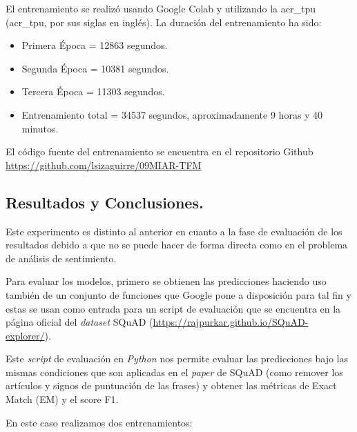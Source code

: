 El entrenamiento se realizó usando Google Colab y utilizando la \acrlong{acr_tpu} (\acrshort{acr_tpu}, por sus siglas en inglés). La duración del entrenamiento ha sido:

\begin{itemize}
    \item Primera Época = 12863 segundos.
    \item Segunda Época = 10381 segundos. 
    \item Tercera Época = 11303 segundos.
    \item Entrenamiento total = 34537 segundos, aproximadamente 9 horas y 40 minutos.
\end{itemize}

El código fuente del entrenamiento se encuentra en el repositorio Github \url{https://github.com/lsizaguirre/09MIAR-TFM}


\subsection{Resultados y Conclusiones.}
\label{subsection-qa-resultados-y-conclusiones}

Este experimento es distinto al anterior en cuanto a la fase de evaluación de los resultados debido a que no se puede hacer de forma directa como en el problema de análisis de sentimiento. 

Para evaluar los modelos, primero se obtienen las predicciones haciendo uso también de un conjunto de funciones que Google pone a disposición para tal fin y estas se usan como entrada para un script de evaluación que se encuentra en la página oficial del \textit{dataset} SQuAD (\url{https://rajpurkar.github.io/SQuAD-explorer/}). 

Este \textit{script} de evaluación en \textit{Python} nos permite evaluar las predicciones bajo las mismas condiciones que son aplicadas en el \textit{paper} de SQuAD (como remover los artículos y signos de puntuación de las frases) y obtener las métricas de Exact Match (EM) y el score F1.

En este caso realizamos dos entrenamientos:

